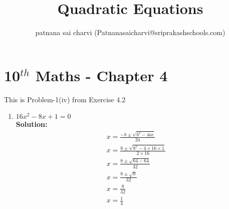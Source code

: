 \documentclass[12pt]{article}
\author{patnana sai charvi (Patnanasaicharvi@sriprakashschools.com)}
\newcommand{\solution}{\noindent \textbf{Solution: }}
\begin{document}
\begin{center}
\title{\textbf{Quadratic Equations}}
\end{center}
\section*{10$^{th}$ Maths - Chapter 4}
This is Problem-1(iv) from Exercise 4.2
\begin{enumerate}
\item ${16}x^2-{8} x +{1} = 0$\\
\solution\\
\begin{align}
x=\frac{-b\pm\sqrt{b^2-4ac}}{2a}\\
x=\frac{8\pm\sqrt{8^2-4 \times 16 \times 1}}{2 \times 16}\\                                                        x=\frac{8\pm\sqrt{64-64}}{32}\\
x=\frac{8\pm\sqrt{0}}{32}\\
x=\frac{8}{32}\\
x=\frac{1}{4}
\end{align}
\end{enumerate}
\end{document}

